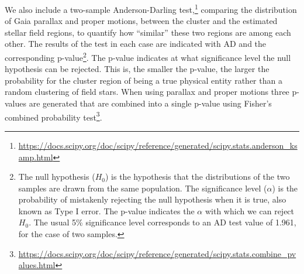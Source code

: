 \documentclass[draft]{aa}
\begin{document}
We also include a two-sample Anderson-Darling
test,\footnote{\url{https://docs.scipy.org/doc/scipy/reference/generated/scipy.stats.anderson_ksamp.html}}
comparing the distribution of Gaia parallax and proper motions,
between the cluster and the estimated stellar field regions, to quantify how
``similar'' these two regions are among each other.
The results of the test in each case are indicated with AD and the
corresponding p-value\footnote{The null hypothesis ($H_{0}$) is the
hypothesis that the distributions of the two samples are drawn from the same
population. The significance level ($\alpha$) is the probability of mistakenly
rejecting the null hypothesis when it is true, also known as Type I error. The
p-value indicates the $\alpha$ with which we can reject $H_{0}$. The usual 5\%
significance level corresponds to an AD test value of 1.961, for the case of two
samples.}. The p-value indicates at what significance level the null hypothesis
can be rejected. This is, the smaller the p-value, the larger the probability
for the cluster region of being a true physical entity rather than a random
clustering of field stars. When using parallax and proper motions three
p-values are generated that are combined into a single p-value using Fisher's
combined probability test\footnote{\url{https://docs.scipy.org/doc/scipy/reference/generated/scipy.stats.combine_pvalues.html}}.









\end{document}
